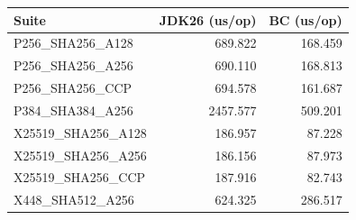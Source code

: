 \begin{tabular}{lrr}
\hline
Suite & JDK26 (us/op) & BC (us/op) \\
\hline
P256_SHA256_A128 & 689.822 & 168.459 \\
P256_SHA256_A256 & 690.110 & 168.813 \\
P256_SHA256_CCP & 694.578 & 161.687 \\
P384_SHA384_A256 & 2457.577 & 509.201 \\
X25519_SHA256_A128 & 186.957 & 87.228 \\
X25519_SHA256_A256 & 186.156 & 87.973 \\
X25519_SHA256_CCP & 187.916 & 82.743 \\
X448_SHA512_A256 & 624.325 & 286.517 \\
\hline
\end{tabular}
